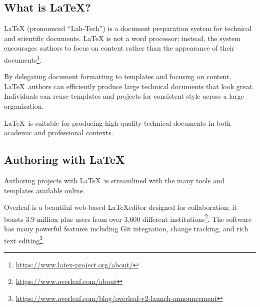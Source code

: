 
\subsection{What is \LaTeX?}
LaTeX (pronounced \enquote{Lah-Tech}) is a document preparation system for technical and scientiﬁc documents. LaTeX is not a word processor; instead, the system encourages authors to focus on content rather than the appearance of their documents\footnote{\url{https://www.latex-project.org/about/}}. 

\begin{minipage}{\linewidth}
\end{minipage}

By delegating document formatting to templates and focusing on content, \LaTeX\ authors can efficiently produce large technical documents that look great. Individuals can reuse templates and projects for consistent style across a large organization.
\par
\LaTeX\ is suitable for producing high-quality technical documents in both academic and professional contexts.

\subsection{Authoring with \LaTeX}
Authoring projects with \LaTeX\ is streamlined with the many tools and templates available online.
\par
Overleaf is a beautiful web-based \LaTeX editor designed for collaboration; it boasts 3.9 million plus users from over 3,600 different institutions\footnote{\url{https://www.overleaf.com/about}}.
The software has many powerful features including Git integration, change tracking, and rich text editing\footnote{\url{https://www.overleaf.com/blog/overleaf-v2-launch-announcement}}.

